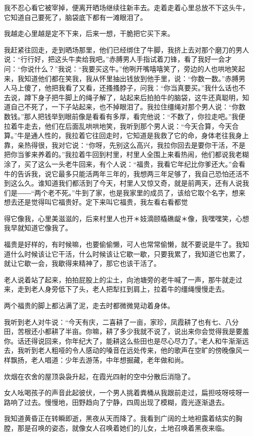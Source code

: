 \documentclass[12pt,UTF8]{ctexbook}
\begin{document}
我不忍心看它被宰掉，便离开晒场继续往新丰去。走着走着心里总放不下这头牛，它知道自己要死了，脑袋底下都有一滩眼泪了。

我越走心里越是定不下来，后来一想，干脆把它买下来。

我赶紧往回走，走到晒场那里，他们已经绑住了牛脚，我挤上去对那个磨刀的男人说：“行行好，把这头牛卖给我吧。”赤膊男人手指试着刀锋，看了我好一会才问：“你说什么？”我说：“我要买这牛。”他咧开嘴嘻嘻笑了，旁边的人也哄地笑起来，我知道他们都在笑我，我从怀里抽出钱放到他手里，说：“你数一数。”赤膊男人马上傻了，他把我看了又看，还搔搔脖子，问我：“你当真要买。”我什么话也不去说，蹲下身子把牛脚上的绳子解了，站起来后拍拍牛的脑袋，这牛还真聪明，知道自己不死了，一下子站起来，也不掉眼泪了。我拉住缰绳对那个男人说：“你数数钱。”那人把钱举到眼前像是看看有多厚，看完他说：“不数了，你拉走吧。”我便拉着牛走去，他们在后面乱哄哄地笑，我听到那个男人说：“今天合算，今天合算。”牛是通人性的，我拉着它往回走时，它知道是我救了它的命，身体老往我身上靠，亲热得很，我对它说：“你呀，先别这么高兴，我拉你回去是要你干活，不是把你当爹来养着的。”我拉着牛回到村里，村里人全围上来看热闹，他们都说我老糊涂了，买了这么一头老牛回来，有个人说：“福贵，我看它年纪比你爹还大。”会看牛的告诉我，说它最多只能活两年三年的，我想两三年足够了，我自己恐怕还活不到这么久。谁知道我们都活到了今天，村里人又惊又奇，就是前两天，还有人说我们是――“两个老不死。”牛到了家，也是我家里的成员了，该给它取个名字，想来想去还是觉得叫它福贵好。定下来叫它福贵，我左看右看都觉


得它像我，心里美滋滋的，后来村里人也开＊妓滴颐橇礁龊＊像，我嘿嘿笑，心想我早就知道它像我了。

福贵是好样的，有时候嘛，也要偷偷懒，可人也常常偷懒，就不要说是牛了。我知道什么时候该让它干活，什么时候该让它歇一歇，只要我累了，我知道它也累了，就让它歇一会，我歇得来精神了，那它也该干活了。

老人说着站了起来，拍拍屁股上的尘土，向池塘旁的老牛喊了一声，那牛就走过来，走到老人身旁低下了头，老人把犁扛到肩上，拉着牛的缰绳慢慢走去。

两个福贵的脚上都沾满了泥，走去时都微微晃动着身体。

我听到老人对牛说：“今天有庆，二喜耕了一亩，家珍，凤霞耕了也有七、八分田，苦根还小都耕了半亩。你嘛，耕了多少我就不说了，说出来你会觉得我是要羞你。话还得说回来，你年纪大了，能耕这么些田也是尽心尽力了。”老人和牛渐渐远去，我听到老人粗哑的令人感动的嗓音在远处传来，他的歌声在空旷的傍晚像风一样飘扬，老人唱道：少年去游荡，中年想掘藏，老年做和尚。

炊烟在农舍的屋顶袅袅升起，在霞光四射的空中分散后消隐了。

女人吆喝孩子的声音此起彼伏，一个男人挑着粪桶从我跟前走过，扁担吱呀吱呀一路响了过去。慢慢地，田野趋向了宁静，四周出现了模糊，霞光逐渐退去。

我知道黄昏正在转瞬即逝，黑夜从天而降了。我看到广阔的土地袒露着结实的胸膛，那是召唤的姿态，就像女人召唤着她们的儿女，土地召唤着黑夜来临。

\backmatter
\end{document}
